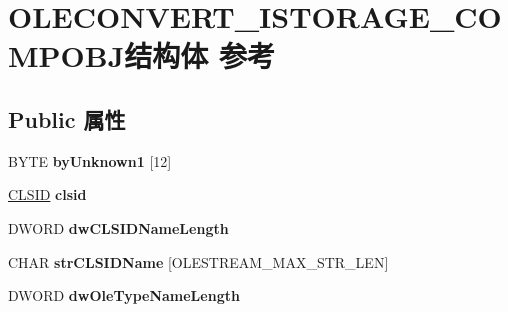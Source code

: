 \hypertarget{struct_o_l_e_c_o_n_v_e_r_t___i_s_t_o_r_a_g_e___c_o_m_p_o_b_j}{}\section{O\+L\+E\+C\+O\+N\+V\+E\+R\+T\+\_\+\+I\+S\+T\+O\+R\+A\+G\+E\+\_\+\+C\+O\+M\+P\+O\+B\+J结构体 参考}
\label{struct_o_l_e_c_o_n_v_e_r_t___i_s_t_o_r_a_g_e___c_o_m_p_o_b_j}
\subsection*{Public 属性}
\begin{DoxyCompactItemize}
\item 
\mbox{\label{struct_o_l_e_c_o_n_v_e_r_t___i_s_t_o_r_a_g_e___c_o_m_p_o_b_j_a788e7bd34688cd3dfbbe778a3c662fc4}} 
B\+Y\+TE {\bfseries by\+Unknown1} \mbox{[}12\mbox{]}
\item 
\mbox{\label{struct_o_l_e_c_o_n_v_e_r_t___i_s_t_o_r_a_g_e___c_o_m_p_o_b_j_a2f352921d9be7095f894b34b17d8c262}} 
\hyperlink{struct___i_i_d}{C\+L\+S\+ID} {\bfseries clsid}
\item 
\mbox{\label{struct_o_l_e_c_o_n_v_e_r_t___i_s_t_o_r_a_g_e___c_o_m_p_o_b_j_ae6f7bba5d7f9fb1e267fe81f798982ed}} 
D\+W\+O\+RD {\bfseries dw\+C\+L\+S\+I\+D\+Name\+Length}
\item 
\mbox{\label{struct_o_l_e_c_o_n_v_e_r_t___i_s_t_o_r_a_g_e___c_o_m_p_o_b_j_a2f315ffb8f1d378031fc82c92b7da431}} 
C\+H\+AR {\bfseries str\+C\+L\+S\+I\+D\+Name} \mbox{[}O\+L\+E\+S\+T\+R\+E\+A\+M\+\_\+\+M\+A\+X\+\_\+\+S\+T\+R\+\_\+\+L\+EN\mbox{]}
\item 
\mbox{\label{struct_o_l_e_c_o_n_v_e_r_t___i_s_t_o_r_a_g_e___c_o_m_p_o_b_j_a8903a383efbd14208cf49a4fff70b86d}} 
D\+W\+O\+RD {\bfseries dw\+Ole\+Type\+Name\+Length}
\item 
\mbox{\label{struct_o_l_e_c_o_n_v_e_r_t___i_s_t_o_r_a_g_e___c_o_m_p_o_b_j_aa947373695102f0834fffa3900e0550c}} 

\end{DoxyCompactItemize}
